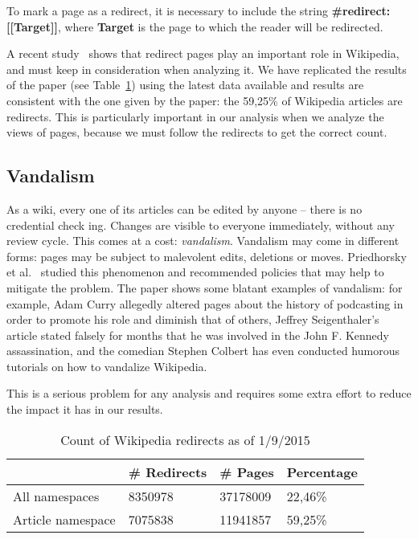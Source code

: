 To mark a page as a redirect, it is necessary to include the string \textbf{\#redirect: [[Target]]}, where \textbf{Target} is the page to which the reader will be redirected.

A recent study~\cite{Hill2014} shows that redirect pages play an important role in Wikipedia, and must keep in consideration when analyzing it.
We have replicated the results of the paper (see Table~\ref{tbl:redirects}) using the latest data available and results are consistent with the one given by the paper: the 59,25\% of Wikipedia articles are redirects.
This is particularly important in our analysis when we analyze the views of pages, because we must follow the redirects to get the correct count.

\subsection{Vandalism}
As a wiki, every one of its articles can be edited by anyone – there is no credential check ing.
Changes are visible to everyone immediately, without any review cycle.
This comes at a cost: \emph{vandalism}.
Vandalism may come in different forms: pages may be subject to malevolent edits, deletions or moves.
Priedhorsky et al.~\cite{Priedhorsky2007} studied this phenomenon and recommended policies that may help to mitigate the problem.
The paper shows some blatant examples of vandalism: for example, Adam Curry allegedly altered pages about the history of podcasting in order to promote his role and diminish that of others, Jeffrey Seigenthaler's article stated falsely for months that he was involved in the John F. Kennedy assassination, and the comedian Stephen Colbert has even conducted humorous tutorials on how to vandalize Wikipedia.

This is a serious problem for any analysis and requires some extra effort to reduce the impact it has in our results.

\begin{table}[]
\centering
\caption{Count of Wikipedia redirects as of 1/9/2015}
\label{tbl:redirects}
\begin{tabular}{llll}
\multicolumn{1}{c}{\textbf{}}          & \multicolumn{1}{c}{\textbf{\# Redirects}} & \multicolumn{1}{c}{\textbf{\# Pages}} & \textbf{Percentage} \\ \hline
\multicolumn{1}{l|}{All namespaces}    & 8350978                                & 37178009                               & 22,46\%             \\
\multicolumn{1}{l|}{Article namespace} & 7075838                                & 11941857                               & 59,25\%
\end{tabular}
\end{table}



